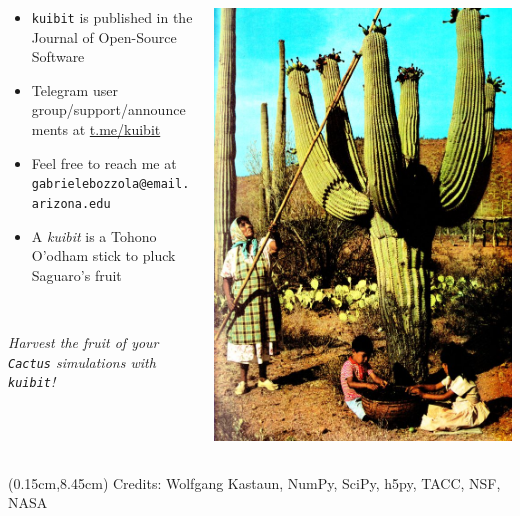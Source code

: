 \documentclass[compress, aspectratio=169]{beamer}
\begin{document}
\begin{frame}
  \centering
  \begin{columns}
    \begin{column}{0.6\linewidth}
      \begin{itemize}
        \item \texttt{kuibit} is published in the Journal of Open-Source Software
        \item Telegram user group/support/announcements at \url{t.me/kuibit}
        \item Feel free to reach me at \texttt{gabrielebozzola@email.arizona.edu}
        \item A \emph{kuibit} is a Tohono O'odham stick to pluck Saguaro's fruit
      \end{itemize}
      \hfill \\[0.5cm]
      \begin{center}
      \emph{Harvest the fruit of your \texttt{Cactus} simulations with \texttt{kuibit}!}
    \end{center}
    \end{column}
    \begin{column}{0.4\linewidth}
      \includegraphics[width=0.85\linewidth]{kuibit}
    \end{column}
  \end{columns}
  \begin{textblock*}{11.5cm}(0.15cm,8.45cm) %
    Credits: Wolfgang Kastaun, NumPy, SciPy, h5py, TACC, NSF, NASA
  \end{textblock*}
\end{frame}
\end{document}
